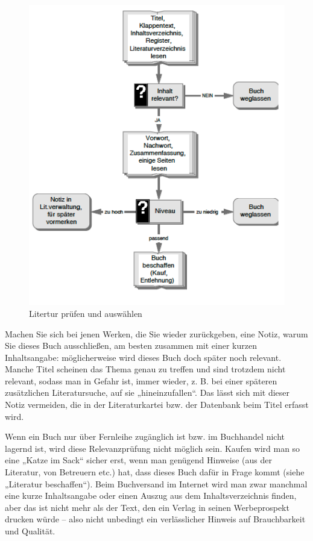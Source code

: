 \documentclass[]{book}
\theoremstyle{definition}
\theoremstyle{definition}
\theoremstyle{definition}
\theoremstyle{remark}
\begin{document}
\begin{figure}

{\centering \includegraphics{images/recherchieren-literatur-auswaehlen-min} 

}

\caption{Litertur prüfen und auswählen}\label{fig:unnamed-chunk-8}
\end{figure}

Machen Sie sich bei jenen Werken, die Sie wieder zurückgeben, eine
Notiz, warum Sie dieses Buch ausschließen, am besten zusammen mit einer
kurzen Inhaltsangabe: möglicherweise wird dieses Buch doch später noch
relevant. Manche Titel scheinen das Thema genau zu treffen und sind
trotzdem nicht relevant, sodass man in Gefahr ist, immer wieder, z. B.
bei einer späteren zusätzlichen Literatursuche, auf sie
„hineinzufallen``. Das lässt sich mit dieser Notiz vermeiden, die in der
Literaturkartei bzw. der Datenbank beim Titel erfasst wird.

Wenn ein Buch nur über Fernleihe zugänglich ist bzw. im Buchhandel nicht
lagernd ist, wird diese Relevanzprüfung nicht möglich sein. Kaufen wird
man so eine „Katze im Sack`` sicher erst, wenn man genügend Hinweise
(aus der Literatur, von Betreuern etc.) hat, dass dieses Buch dafür in
Frage kommt (siehe „Literatur beschaffen``). Beim Buchversand im
Internet wird man zwar manchmal eine kurze Inhaltsangabe oder einen
Auszug aus dem Inhaltsverzeichnis finden, aber das ist nicht mehr als
der Text, den ein Verlag in seinen Werbeprospekt drucken würde -- also
nicht unbedingt ein verlässlicher Hinweis auf Brauchbarkeit und
Qualität.
\end{document}
